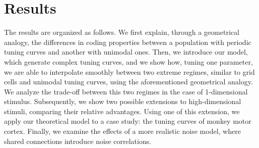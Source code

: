 \documentclass[a4paper]{article}
\begin{document}
\section{Results}
The results are organized as follows. We first explain, through a geometrical analogy, the differences in coding properties between a population with periodic tuning curves and another with unimodal ones. Then, we introduce our model, which generate complex tuning curves, and we show how, tuning one parameter, we are able to interpolate smoothly between two extreme regimes, similar to grid cells and unimodal tuning curves, using the aforementioned geometrical analogy. We analyze the trade-off between this two regimes in the case of 1-dimensional stimulus.  Subsequently, we show two possible extensions to high-dimensional stimuli, comparing their relative advantages. Using one of this extension, we apply our theoretical model to a case study: the tuning curves of monkey motor cortex. Finally, we examine the effects of a more realistic noise model, where shared connections introduce noise correlations.
\end{document}
